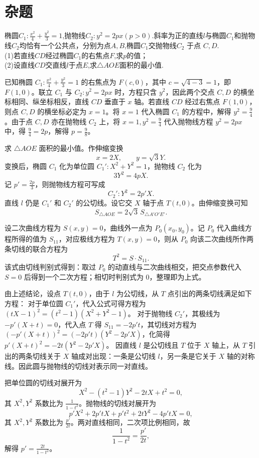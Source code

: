 \chapter{杂题}
\begin{example}[浙江风味圆锥曲线]
椭圆$C_1:\frac{x^2}4+\frac{y^2}3=1$,抛物线$C_2:y^2=2px(p>0).$斜率为正的直线$l$与椭圆$C_1$和抛物线$C_2$均恰有一个公共点，分别为点$A,B$,椭圆$C_1$交抛物线$C_2$ 于点 $C,D.$\\(1)若直线$CD$经过椭圆$C_1$的右焦点$F$,求$p$的值；\\(2)设直线$CD$交直线$l$于点$E$,求$\triangle AOE$面积的最小值.
\end{example}
\begin{solution}
已知椭圆 $C_1:\frac{x^2}{4}+\frac{y^2}{3}=1$ 的右焦点为 $F(c, 0)$，其中 $c = \sqrt{4-3} = 1$，即 $F(1,0)$。联立 $C_1$ 与 $C_2:y^2=2px$ 时，方程只含 $y^2$，因此两个交点 $C,D$ 的横坐标相同、纵坐标相反，直线 $CD$ 垂直于 $x$ 轴。若直线 $CD$ 经过右焦点 $F(1,0)$，则点 $C,D$ 的横坐标必定为 $x=1$。将 $x=1$ 代入椭圆 $C_1$ 的方程中，解得 $y^2 = \frac{9}{4}$。由于点 $C, D$ 亦在抛物线 $C_2$ 上，将 $x=1, y^2=\frac{9}{4}$ 代入抛物线方程 $y^2=2px$ 中，得 $\frac{9}{4} = 2p$，解得 $p = \frac{9}{8}$。

求 $\triangle AOE$ 面积的最小值。作伸缩变换
\[
x = 2X,\qquad y = \sqrt{3}Y.
\]
变换后，椭圆 $C_1$ 化为单位圆 $C_1': X^2+Y^2=1$，抛物线 $C_2$ 化为
\[
3Y^2=4pX.
\]
记 $p' = \frac{2p}{3}$，则抛物线方程可写成
\[
C_2': Y^2=2p'X.
\]
直线 $l$ 仍是 $C_1'$ 和 $C_2'$ 的公切线。设它交 $X$ 轴于点 $T(t,0)$。由伸缩变换可知
\[
S_{\triangle AOE}=2\sqrt{3}\,S_{\triangle A'O'E'}.
\]

设二次曲线方程为 $S(x,y)=0$，曲线外一点为 $P_0(x_0,y_0)$。记 $P_0$ 代入曲线方程所得的值为 $S_{11}$，对应极线方程为 $T(x,y)=0$，则从 $P_0$ 向该二次曲线所作两条切线的联合方程为
\[
T^2=S\cdot S_{11}.
\]
该式由切线判别式得到：取过 $P_0$ 的动直线与二次曲线相交，把交点参数代入 $S=0$ 后得到一个二次方程；相切时判别式为 $0$，整理即为上式。

由上述结论，设点 $T(t, 0)$，由于 $l$ 为公切线，从 $T$ 点引出的两条切线满足如下方程：
对于单位圆 $C_1'$，代入公式可得方程为 $(tX-1)^2 = (t^2-1)(X^2+Y^2-1)$。
对于抛物线 $C_2'$，其极线为 $-p'(X+t)=0$，代入点 $T$ 得 $S_{11} = -2p't$，其切线对方程为 $(-p'(X+t))^2 = (-2p't)(Y^2-2p'X)$，化简得 $p'(X+t)^2 = -2t(Y^2-2p'X)$。
因直线 $l$ 是公切线且 $T$ 位于 $X$ 轴上，从 $T$ 引出的两条切线关于 $X$ 轴成对出现：一条是公切线 $l$，另一条是它关于 $X$ 轴的对称线。因此圆与抛物线的切线对表示同一对直线。

把单位圆的切线对展开为
\[
X^2-(t^2-1)Y^2-2tX+t^2=0,
\]
其 $X^2,Y^2$ 系数比为 $\frac{1}{1-t^2}$。抛物线的切线对展开为
\[
p'X^2+2p'tX+p't^2+2tY^2-4p'tX=0,
\]
其 $X^2,Y^2$ 系数比为 $\frac{p'}{2t}$。两对直线相同，二次项比例相同，故
\[
\frac{1}{1-t^2}=\frac{p'}{2t},
\]
解得 $p' = \frac{2t}{1-t^2}$。


\end{solution}
